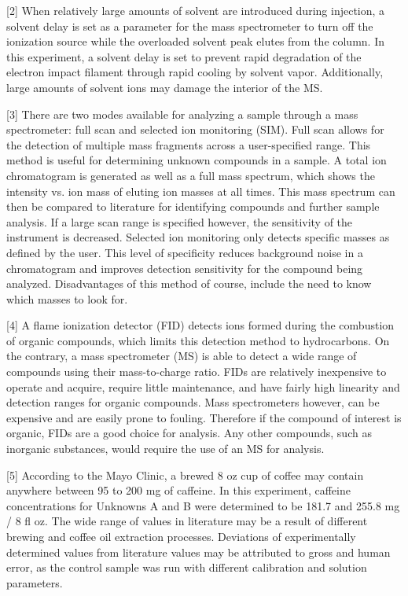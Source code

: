 \documentclass{article}
\begin{document}
\begin{multicols}{2}
{[2] When relatively large amounts of solvent are introduced during injection, a
solvent delay is set as a parameter for the mass spectrometer to turn off the
ionization source while the overloaded solvent peak elutes from the column. In
this experiment, a solvent delay is set to prevent rapid degradation of the
electron impact filament through rapid cooling by solvent vapor. Additionally,
large amounts of solvent ions may damage the interior of the MS.

[3] There are two modes available for analyzing a sample through a mass
spectrometer: full scan and selected ion monitoring (SIM). 
Full scan allows for the detection of multiple mass fragments across a
user-specified range. This method is useful for determining unknown compounds in
a sample. A total ion chromatogram is generated as well as a full mass spectrum,
which shows the intensity vs. ion mass of eluting ion masses at all times. This
mass spectrum can then be compared to literature for identifying compounds and
further sample analysis. If a large scan range is specified however, the
sensitivity of the instrument is decreased.
Selected ion monitoring only detects specific masses as defined by the user.
This level of specificity reduces background noise in a chromatogram and
improves detection sensitivity for the compound being analyzed. Disadvantages of
this method of course, include the need to know which masses to look for.

[4] A flame ionization detector (FID) detects ions formed during the combustion
of organic compounds, which limits this detection method to hydrocarbons.  On
the contrary, a mass spectrometer (MS) is able to detect a wide range of
compounds using their mass-to-charge ratio.  FIDs are relatively inexpensive to
operate and acquire, require little maintenance, and have fairly high linearity
and detection ranges for organic compounds. 
Mass spectrometers however, can be expensive and are easily prone to fouling.
Therefore if the compound of interest is organic, FIDs are a good choice for
analysis. Any other compounds, such as inorganic substances, would require the
use of an MS for analysis.

[5] According to the Mayo Clinic, a brewed 8 oz cup of coffee may contain
anywhere between 95 to 200 mg of caffeine. \cite{mayo}
In this experiment, caffeine concentrations for Unknowns A and B were determined
to be 181.7 and 255.8 mg / 8 fl oz. 
The wide range of values in literature may be a result of different brewing and
coffee oil extraction processes. Deviations of experimentally determined values
from literature values may be attributed to gross and human error, as the
control sample was run with different calibration and solution parameters.


}
\end{multicols}
\end{document}
